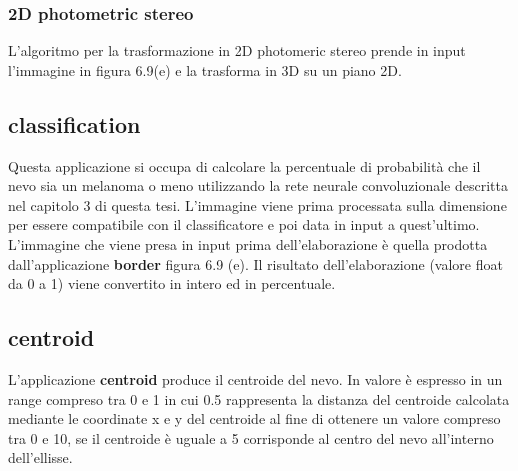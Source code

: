 {\subsubsection{2D photometric stereo}
L'algoritmo per la trasformazione in 2D photomeric stereo prende in input l'immagine in figura 6.9(e) e la trasforma in 3D su un piano 2D.
\newpage
\subsection{classification}
Questa applicazione si occupa di calcolare la percentuale di probabilità che il nevo sia un melanoma o meno utilizzando la rete neurale convoluzionale descritta nel capitolo 3 di questa tesi.
L'immagine viene prima processata sulla dimensione per essere compatibile con il classificatore e poi data in input a quest'ultimo.
L'immagine che viene presa in input prima dell'elaborazione è quella prodotta dall'applicazione \textbf{border} figura 6.9 (e).
Il risultato dell'elaborazione (valore float da 0 a 1) viene convertito in intero ed in percentuale.
\newpage
\subsection{centroid}
L'applicazione \textbf{centroid} produce il centroide del nevo.
In valore è espresso in un range compreso tra 0 e 1 in cui 0.5 rappresenta la distanza del centroide calcolata mediante le coordinate x e y del centroide al fine di ottenere un valore compreso tra 0 e 10, se il centroide è uguale a 5 corrisponde al centro del nevo all'interno dell'ellisse.
}
